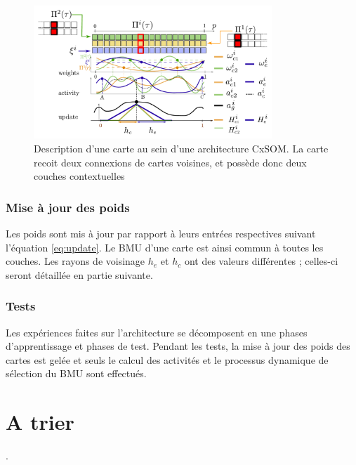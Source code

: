 \begin{figure}
\centering
\includegraphics[width=0.8\textwidth]{one_map.pdf}
\caption{Description d'une carte au sein d'une architecture CxSOM. La carte recoit deux connexions de cartes voisines, et possède donc deux couches contextuelles}
\label{fig:one_map}
\end{figure}

\subsubsection{Mise à jour des poids}

Les poids sont mis à jour par rapport à leurs entrées respectives suivant l'équation \ref{eq:update}. Le BMU d'une carte est ainsi commun à toutes les couches. Les rayons de voisinage $h_e$ et $h_c$ ont des valeurs différentes ; celles-ci seront détaillée en partie suivante. 

\subsubsection{Tests}

Les expériences faites sur l'architecture se décomposent en une phases d'apprentissage et phases de test. Pendant les tests, la mise à jour des poids des cartes est gelée et seuls le calcul des activités et le processus dynamique de sélection du BMU sont effectués.

\section{A trier}
. 